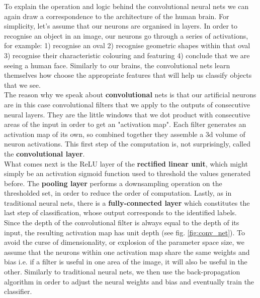 \documentclass[a4paper, 11pt]{article}
\numberwithin{equation}{section}
\begin{document}
		To explain the operation and logic behind the convolutional neural nets we can again draw a correspondence to the architecture of the human brain. For simplicity, let's assume that our neurons are organised in layers. In order to recognise an object in an image, our neurons go through a series of activations, for example: 1) recognise an oval 2) recognise geometric shapes within that oval 3) recognise their characteristic colouring and featuring 4) conclude that we are seeing a human face. \cite{seung2013connectome} Similarly to our brains, the convolutional nets learn themselves how choose the appropriate features that will help us classify objects that we see. \\
		
		\noindent The reason why we speak about \textbf{convolutional} nets \cite{stanford2016convnets} is that our artificial neurons are in this case convolutional filters that we apply to the outputs of consecutive neural layers. They are the little windows that we dot product with consecutive areas of the input in order to get an "activation map". Each filter generates an activation map of its own, so combined together they assemble a 3d volume of neuron activations. This first step of the computation is, not surprisingly, called the \textbf{convolutional layer}.\\
		What comes next is the ReLU layer of the \textbf{rectified linear unit}, which might simply be an activation sigmoid function used to threshold the values generated before. 
		The \textbf{pooling layer} performs a downsampling operation on the thresholded set, in order to reduce the order of computation.
		Lastly, as in traditional neural nets, there is  a \textbf{fully-connected layer} which constitutes the last step of classification, whose output corresponds to the identified labels.\\
		
		\noindent Since the depth of the convolutional filter is always equal to the depth of its input, the resulting activation map has unit depth (see fig. \ref{fig:conv_net}). To avoid the curse of dimensionality, or explosion of the parameter space size, we assume that the neurons within one activation map share the same weights and bias i.e. if a filter is useful in one area of the image, it will also be useful in the other. Similarly to traditional neural nets, we then use the back-propagation algorithm in order to adjust the neural weights and bias and eventually train the classifier. \\
		
\end{document}
